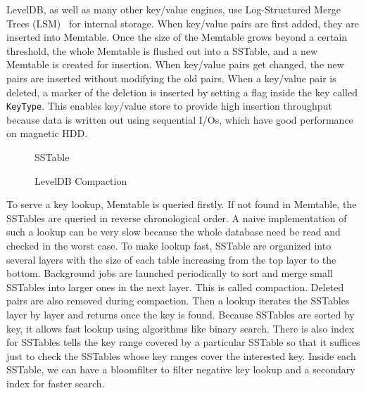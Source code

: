 LevelDB, as well as many other key/value engines, use Log-Structured
Merge Trees (LSM)~\cite{lsm} for internal storage. When key/value
pairs are first added, they are inserted into Memtable.  Once the size
of the Memtable grows beyond a certain threshold, the whole Memtable
is flushed out into a SSTable, and a new Memtable is created for
insertion. When key/value pairs get changed, the new pairs are
inserted without modifying the old pairs. When a key/value pair is
deleted, a marker of the deletion is inserted by setting a flag inside
the key called \texttt{KeyType}. This enables key/value store to
provide high insertion throughput because data is written out using
sequential I/Os, which have good performance on magnetic HDD. 

\begin{figure}[t]
\begin{centering}
\caption{SSTable}
\label{fig:sstable}
\end{centering}
\end{figure}

\begin{figure}[t]
\begin{centering}
\caption{LevelDB Compaction}
\label{fig:compact}
\end{centering}
\end{figure}

To serve a key lookup, Memtable is queried firstly. If not found in
Memtable, the SSTables are queried in reverse chronological order. A
naive implementation of such a lookup can be very slow because the
whole database need be read and checked in the worst case. To make
lookup fast, SSTable are organized into several layers with the size
of each table increasing from the top layer to the bottom. Background
jobs are launched periodically to sort and merge small SSTables into
larger ones in the next layer. This is called compaction. Deleted
pairs are also removed during compaction. Then a lookup iterates the
SSTables layer by layer and returns once the key is found.  Because
SSTables are sorted by key, it allows fast lookup using algorithms
like binary search. There is also index for SSTables tells the key
range covered by a particular SSTable so that it suffices just to
check the SSTables whose key ranges cover the interested key. Inside
each SSTable, we can have a bloomfilter to filter negative key lookup
and a secondary index for faster search.


